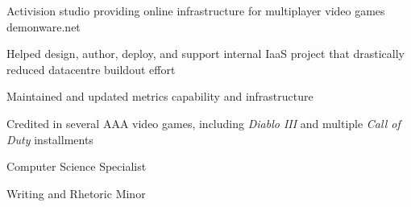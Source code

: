 \documentclass[letterpaper,11pt,notitlepage]{article}
\begin{document}
    \companydescurl
       {Activision studio providing online infrastructure for multiplayer video
         games}
       {demonware.net} \\
    \begin{employment}
        \item Helped design, author, deploy, and support internal IaaS
              project that drastically reduced datacentre buildout effort
        \item Maintained and updated metrics capability and infrastructure
        \item Credited in several AAA video games, including
          {\it Diablo III} and multiple {\it Call of Duty} installments
    \end{employment}
    \begin{employment}
        \item Computer Science Specialist
        \item Writing and Rhetoric Minor
    \end{employment}
\vbar{}
\end{document}
